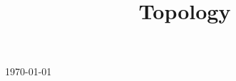 

\title{Topology}

\usepackage[sort=standard]{glossaries} 
\makeglossaries
\setcounter{tocdepth}{3}



\maketitle
\centerline{\today}
\tableofcontents







